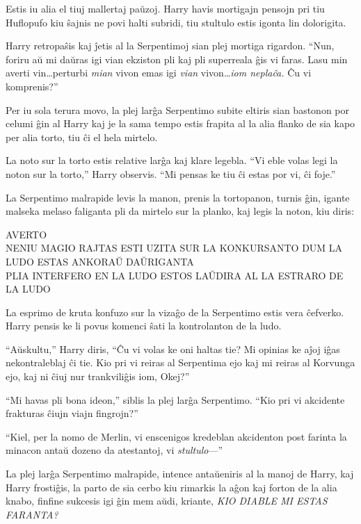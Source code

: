 Estis iu alia el tiuj mallertaj paŭzoj. Harry havis mortigajn pensojn
pri tiu Huflopufo kiu ŝajnis ne povi halti subridi, tiu stultulo estis
igonta lin dolorigita.

Harry retropaŝis kaj ĵetis al la Serpentimoj sian plej mortiga
rigardon. ``Nun, foriru aŭ mi daŭras igi vian ekziston pli kaj pli
superreala ĝis vi faras. Lasu min averti vin\ldots perturbi
\emph{mian} vivon emas igi \emph{vian} vivon\ldots \emph{iom neplaĉa.}
Ĉu vi komprenis?''

Per iu sola terura movo, la plej larĝa Serpentimo subite eltiris sian
bastonon por celumi ĝin al Harry kaj je la sama tempo estis frapita al
la alia flanko de sia kapo per alia torto, tiu ĉi el hela mirtelo.

La noto sur la torto estis relative larĝa kaj klare legebla. ``Vi eble
volas legi la noton sur la torto,'' Harry observis. ``Mi pensas ke
tiu ĉi estas por vi, ĉi foje.'' 

La Serpentimo malrapide levis la manon, prenis la tortopanon, turnis
ĝin, igante malseka melaso faliganta pli da mirtelo sur la planko, kaj legis
la noton, kiu diris:

\begin{center}
  AVERTO\\

  NENIU MAGIO RAJTAS ESTI UZITA SUR LA KONKURSANTO DUM LA LUDO ESTAS ANKORAŬ DAŬRIGANTA \\
  PLIA INTERFERO EN LA LUDO ESTOS LAŬDIRA AL LA ESTRARO DE LA LUDO
\end{center}

La esprimo de kruta konfuzo sur la vizaĝo de la Serpentimo estis vera
ĉefverko. Harry pensis ke li povus komenci ŝati la kontrolanton de la
ludo.

``Aŭskultu,'' Harry diris, ``Ĉu vi volas ke oni haltas tie? Mi opinias
ke aĵoj iĝas nekontraleblaj ĉi tie. Kio pri vi reiras al Serpentima
ejo kaj mi reiras al Korvunga ejo, kaj ni ĉiuj nur trankviliĝis iom,
Okej?''

``Mi havas pli bona ideon,'' siblis la plej larĝa Serpentimo. ``Kio
pri vi akcidente frakturas ĉiujn viajn fingrojn?''

``Kiel, per la nomo de Merlin, vi enscenigos kredeblan akcidenton post
farinta la minacon antaŭ dozeno da atestantoj, vi \emph{stultulo}—''


La plej larĝa Serpentimo malrapide, intence antaŭeniris al la manoj de
Harry, kaj Harry frostiĝis, la parto de sia cerbo kiu rimarkis la aĝon
kaj forton de la alia knabo, finfine sukcesis igi ĝin mem aŭdi,
kriante, \emph{KIO DIABLE MI ESTAS FARANTA?}


